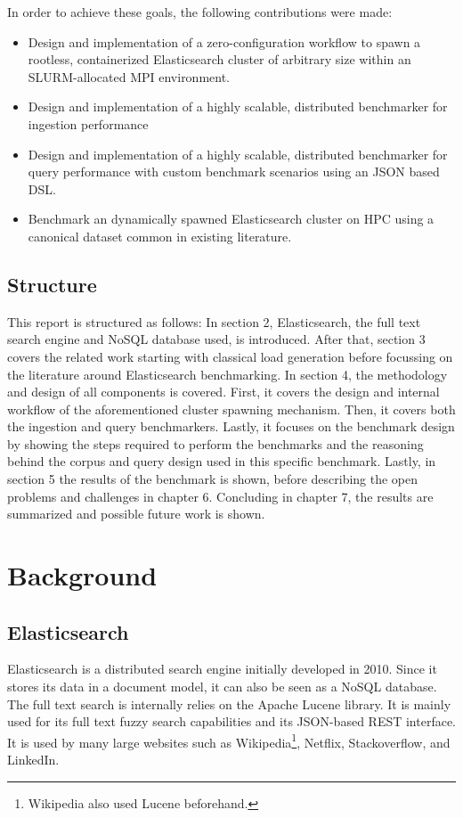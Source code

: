 In order to achieve these goals, the following contributions were made:

\begin{itemize}
\item Design and implementation of a zero-configuration workflow to spawn a rootless, containerized Elasticsearch cluster of arbitrary size within an SLURM-allocated \ac{MPI} environment.
\item Design and implementation of a highly scalable, distributed benchmarker for ingestion performance
\item Design and implementation of a highly scalable, distributed benchmarker for query performance with custom benchmark scenarios using an \ac{JSON} based \ac{DSL}.
\item Benchmark an dynamically spawned Elasticsearch cluster on \ac{HPC} using a canonical dataset common in existing literature.
\end{itemize}
\subsection{Structure}
This report is structured as follows: In section 2, Elasticsearch, the full text search engine and NoSQL database used, is introduced. After that, section 3 covers the related work starting with classical load generation before focussing on the literature around Elasticsearch benchmarking. In section 4, the methodology and design of all components is covered. First, it covers the design and internal workflow of the aforementioned cluster spawning mechanism. Then, it covers both the ingestion and query benchmarkers. Lastly, it focuses on the benchmark design by showing the steps required to perform the benchmarks and the reasoning behind the corpus and query design used in this specific benchmark. Lastly, in section 5 the results of the benchmark is shown, before describing the open problems and challenges in chapter 6. Concluding in chapter 7, the results are summarized and possible future work is shown.

\section{Background}
\subsection{Elasticsearch}
Elasticsearch is a distributed search engine initially developed in 2010. Since it stores its data in a document model, it can also be seen as a NoSQL database. The full text search is internally relies on the Apache Lucene library. It is mainly used for its full text fuzzy search capabilities and its \ac{JSON}-based REST interface. It is used by many large websites such as Wikipedia\footnote{Wikipedia also used Lucene beforehand.}, Netflix, Stackoverflow, and LinkedIn.

